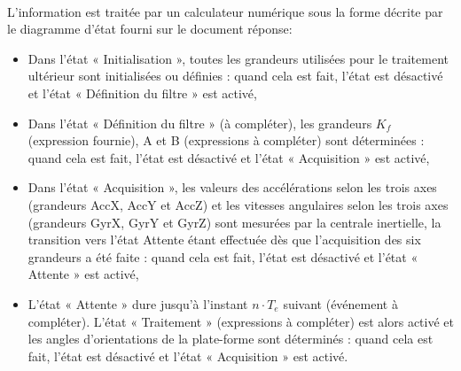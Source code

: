


~\

L’information est traitée par un calculateur numérique sous la forme décrite par le diagramme d’état fourni sur le document réponse:
\begin{itemize}
 \item Dans l’état « Initialisation », toutes les grandeurs utilisées pour le traitement ultérieur sont initialisées ou
définies : quand cela est fait, l’état est désactivé et l’état « Définition du filtre » est activé,
 \item Dans l’état « Définition du filtre » (à compléter), les grandeurs $K_f$ (expression fournie), A et B (expressions à compléter) sont déterminées : quand cela est fait, l’état est désactivé et l’état « Acquisition » est activé,
 \item Dans l’état « Acquisition », les valeurs des accélérations selon les trois axes (grandeurs AccX, AccY et AccZ) et les vitesses angulaires selon les trois axes (grandeurs GyrX, GyrY et GyrZ) sont mesurées par la centrale inertielle, la transition vers l’état Attente étant effectuée dès que l’acquisition des six grandeurs a été faite :
quand cela est fait, l’état est désactivé et l’état « Attente » est activé,
 \item L’état « Attente » dure jusqu’à l’instant $n\cdot T_e$ suivant (événement à compléter). L’état « Traitement » (ex­pressions à compléter) est alors activé et les angles d’orientations de la plate-forme sont déterminés : quand cela est fait, l’état est désactivé et l’état « Acquisition » est activé.
\end{itemize}

~\

